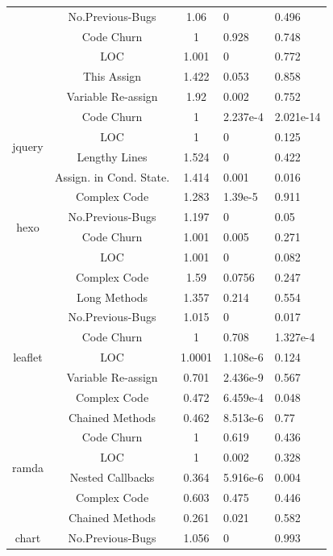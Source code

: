 \documentclass[smallcondensed]{svjour3}
\begin{document}
\begin{table}[t]
\begin{tabular}{c|c|c|p{1.1cm}|p{1.3cm}}
		& No.Previous-Bugs & 1.06 & 0 & 0.496 \\ \cline{2-5}
		& Code Churn & 1 & 0.928 & 0.748 \\ \cline{2-5}
		& LOC & 1.001 & 0 & 0.772 \\ \cline{2-5}
		& This Assign & 1.422 & 0.053 & 0.858 \\ \cline{2-5}
		& Variable Re-assign & 1.92 & 0.002 & 0.752 \\ \hline
		\multirow{4}{*}{jquery}
		& Code Churn & 1 & 2.237e-4 & 2.021e-14 \\ \cline{2-5}
		& LOC & 1 & 0 & 0.125 \\ \cline{2-5}
		& Lengthy Lines & 1.524 & 0 & 0.422 \\ \cline{2-5}
		& Assign. in Cond. State. & 1.414 & 0.001 & 0.016 \\ \cline{2-5}
		& Complex Code & 1.283 & 1.39e-5 & 0.911 \\ \hline
		\multirow{2}{*}{hexo}
		& No.Previous-Bugs & 1.197 & 0 & 0.05 \\ \cline{2-5}
		& Code Churn & 1.001 & 0.005 & 0.271 \\ \cline{2-5}
		& LOC & 1.001 & 0 & 0.082 \\ \cline{2-5}
		& Complex Code & 1.59 & 0.0756 & 0.247 \\ \cline{2-5}
		& Long Methods & 1.357 & 0.214 & 0.554 \\ \hline
		\multirow{5}{*}{leaflet}
		& No.Previous-Bugs & 1.015 & 0 & 0.017 \\ \cline{2-5}
		& Code Churn & 1 & 0.708 & 1.327e-4 \\ \cline{2-5}
		& LOC & 1.0001 & 1.108e-6 & 0.124 \\ \cline{2-5}
		& Variable Re-assign & 0.701 & 2.436e-9 & 0.567 \\ \cline{2-5}
		& Complex Code & 0.472 & 6.459e-4 & 0.048 \\ \cline{2-5}
		& Chained Methods & 0.462 & 8.513e-6 & 0.77 \\ \hline
		\multirow{4}{*}{ramda}
		& Code Churn & 1 & 0.619 & 0.436 \\ \cline{2-5}
		& LOC & 1 & 0.002 & 0.328 \\ \cline{2-5}
		& Nested Callbacks & 0.364 & 5.916e-6 & 0.004 \\ \cline{2-5}
		& Complex Code & 0.603 & 0.475 & 0.446 \\ \cline{2-5}
		& Chained Methods & 0.261 & 0.021 & 0.582 \\ \hline
		\multirow{4}{*}{chart}
		& No.Previous-Bugs & 1.056 & 0 & 0.993 \\ \cline{2-5}

\end{tabular}
\end{table}
\end{document}
